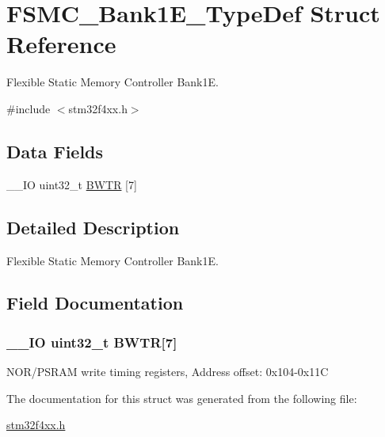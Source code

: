 \hypertarget{struct_f_s_m_c___bank1_e___type_def}{\section{F\-S\-M\-C\-\_\-\-Bank1\-E\-\_\-\-Type\-Def Struct Reference}
\label{struct_f_s_m_c___bank1_e___type_def}
}


Flexible Static Memory Controller Bank1\-E.  




{\ttfamily \#include $<$stm32f4xx.\-h$>$}

\subsection*{Data Fields}
\begin{DoxyCompactItemize}
\item 
\-\_\-\-\_\-\-I\-O uint32\-\_\-t \hyperlink{struct_f_s_m_c___bank1_e___type_def_a20f13b79c0f8670af319af0c5ebd5c91}{B\-W\-T\-R} \mbox{[}7\mbox{]}
\end{DoxyCompactItemize}


\subsection{Detailed Description}
Flexible Static Memory Controller Bank1\-E. 

\subsection{Field Documentation}
\hypertarget{struct_f_s_m_c___bank1_e___type_def_a20f13b79c0f8670af319af0c5ebd5c91}{
\subsubsection[{B\-W\-T\-R}]{\setlength{\rightskip}{0pt plus 5cm}\-\_\-\-\_\-\-I\-O uint32\-\_\-t B\-W\-T\-R\mbox{[}7\mbox{]}}}\label{struct_f_s_m_c___bank1_e___type_def_a20f13b79c0f8670af319af0c5ebd5c91}
N\-O\-R/\-P\-S\-R\-A\-M write timing registers, Address offset\-: 0x104-\/0x11\-C 

The documentation for this struct was generated from the following file\-:\begin{DoxyCompactItemize}
\item 
\hyperlink{stm32f4xx_8h}{stm32f4xx.\-h}\end{DoxyCompactItemize}
